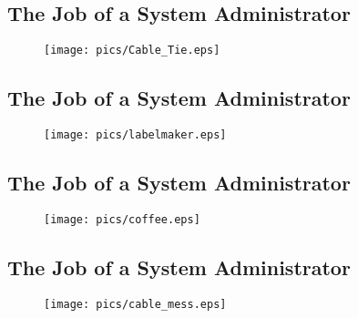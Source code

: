 \documentclass[xga]{xdvislides}
\begin{document}
\subsection{The Job of a System Administrator}
\vspace*{\fill}
\begin{figure}[hb]
	\begin{center}
		\texttt{[image: pics/Cable\_Tie.eps]} \\
	\end{center}
\end{figure}
\vspace*{\fill}

\subsection{The Job of a System Administrator}
\vspace*{\fill}
\begin{figure}[hb]
	\begin{center}
		\texttt{[image: pics/labelmaker.eps]} \\
	\end{center}
\end{figure}
\vspace*{\fill}

\subsection{The Job of a System Administrator}
\vspace*{\fill}
\begin{figure}[hb]
	\begin{center}
		\texttt{[image: pics/coffee.eps]} \\
	\end{center}
\end{figure}
\vspace*{\fill}

\subsection{The Job of a System Administrator}
\vspace*{\fill}
\begin{figure}[hb]
	\begin{center}
		\texttt{[image: pics/cable\_mess.eps]} \\
	\end{center}
\end{figure}
\vspace*{\fill}
\end{document}
